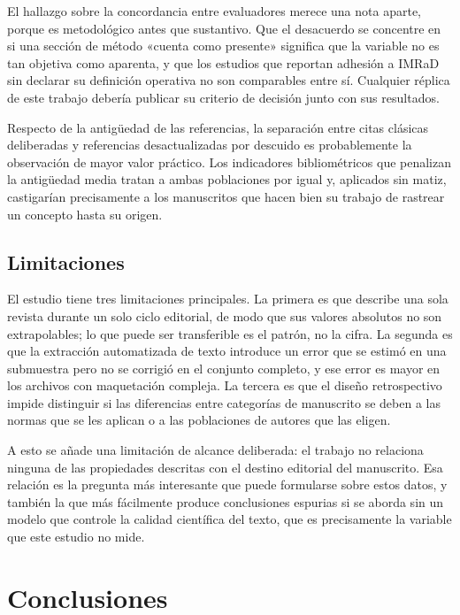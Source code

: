 \documentclass{apm-editorial}
\begin{document}
El hallazgo sobre la concordancia entre evaluadores merece una nota
aparte, porque es metodológico antes que sustantivo. Que el desacuerdo
se concentre en si una sección de método «cuenta como presente»
significa que la variable no es tan objetiva como aparenta, y que los
estudios que reportan adhesión a IMRaD sin declarar su definición
operativa no son comparables entre sí. Cualquier réplica de este
trabajo debería publicar su criterio de decisión junto con sus
resultados.

Respecto de la antigüedad de las referencias, la separación entre citas
clásicas deliberadas y referencias desactualizadas por descuido es
probablemente la observación de mayor valor práctico. Los indicadores
bibliométricos que penalizan la antigüedad media tratan a ambas
poblaciones por igual y, aplicados sin matiz, castigarían precisamente
a los manuscritos que hacen bien su trabajo de rastrear un concepto
hasta su origen.

\subsection*{Limitaciones}

El estudio tiene tres limitaciones principales. La primera es que
describe una sola revista durante un solo ciclo editorial, de modo que
sus valores absolutos no son extrapolables; lo que puede ser
transferible es el patrón, no la cifra. La segunda es que la extracción
automatizada de texto introduce un error que se estimó en una
submuestra pero no se corrigió en el conjunto completo, y ese error es
mayor en los archivos con maquetación compleja. La tercera es que el
diseño retrospectivo impide distinguir si las diferencias entre
categorías de manuscrito se deben a las normas que se les aplican o a
las poblaciones de autores que las eligen.

A esto se añade una limitación de alcance deliberada: el trabajo no
relaciona ninguna de las propiedades descritas con el destino editorial
del manuscrito. Esa relación es la pregunta más interesante que puede
formularse sobre estos datos, y también la que más fácilmente produce
conclusiones espurias si se aborda sin un modelo que controle la
calidad científica del texto, que es precisamente la variable que este
estudio no mide.

\section*{Conclusiones}
\end{document}
